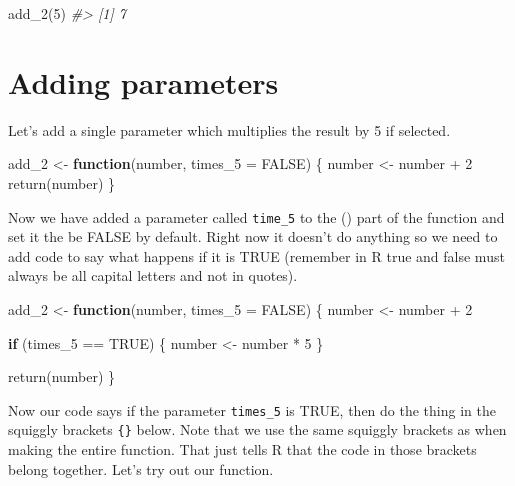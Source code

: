 \documentclass[
]{krantz}
\makeatletter
\newenvironment{Shaded}{\begin{snugshade}}{\end{snugshade}}
\newcommand{\AttributeTok}[1]{\textcolor[rgb]{0.61,0.61,0.61}{#1}}
\newcommand{\CommentTok}[1]{\textcolor[rgb]{0.37,0.37,0.37}{\textit{#1}}}
\newcommand{\ConstantTok}[1]{\textcolor[rgb]{0,0,0}{#1}}
\newcommand{\ControlFlowTok}[1]{\textcolor[rgb]{0.27,0.27,0.27}{\textbf{#1}}}
\newcommand{\DecValTok}[1]{\textcolor[rgb]{0.06,0.06,0.06}{#1}}
\newcommand{\FunctionTok}[1]{\textcolor[rgb]{0,0,0}{#1}}
\newcommand{\NormalTok}[1]{#1}
\newcommand{\OtherTok}[1]{\textcolor[rgb]{0.37,0.37,0.37}{#1}}
\newcommand{\SpecialCharTok}[1]{\textcolor[rgb]{0,0,0}{#1}}
\newenvironment{kframe}{%
\medskip{}
\setlength{\fboxsep}{.8em}
 \def\at@end@of@kframe{}%
 \ifinner\ifhmode%
  \def\at@end@of@kframe{\end{minipage}}%
  \begin{minipage}{\columnwidth}%
 \fi\fi%
 \def\FrameCommand##1{\hskip\@totalleftmargin \hskip-\fboxsep
 \colorbox{shadecolor}{##1}\hskip-\fboxsep
     \hskip-\linewidth \hskip-\@totalleftmargin \hskip\columnwidth}%
 \MakeFramed {\advance\hsize-\width
   \@totalleftmargin\z@ \linewidth\hsize
   \@setminipage}}%
 {\par\unskip\endMakeFramed%
 \at@end@of@kframe}
\renewenvironment{Shaded}{\begin{kframe}}{\end{kframe}}
\makeatother
\begin{document}
\begin{Shaded}
\begin{Highlighting}[]
\FunctionTok{add\_2}\NormalTok{(}\DecValTok{5}\NormalTok{)}
\CommentTok{\#\textgreater{} [1] 7}
\end{Highlighting}
\end{Shaded}

\hypertarget{adding-parameters}{%
\section{Adding parameters}\label{adding-parameters}}

Let's add a single parameter which multiplies the result by
5 if selected.

\begin{Shaded}
\begin{Highlighting}[]
\NormalTok{add\_2 }\OtherTok{\textless{}{-}} \ControlFlowTok{function}\NormalTok{(number, }\AttributeTok{times\_5 =} \ConstantTok{FALSE}\NormalTok{) \{}
\NormalTok{  number }\OtherTok{\textless{}{-}}\NormalTok{ number }\SpecialCharTok{+} \DecValTok{2}
  \FunctionTok{return}\NormalTok{(number)}
\NormalTok{\}}
\end{Highlighting}
\end{Shaded}

Now we have added a parameter called \texttt{time\_5} to the
() part of the function and set it the be FALSE by default.
Right now it doesn't do anything so we need to add code to
say what happens if it is TRUE (remember in R true and false
must always be all capital letters and not in quotes).

\begin{Shaded}
\begin{Highlighting}[]
\NormalTok{add\_2 }\OtherTok{\textless{}{-}} \ControlFlowTok{function}\NormalTok{(number, }\AttributeTok{times\_5 =} \ConstantTok{FALSE}\NormalTok{) \{}
\NormalTok{  number }\OtherTok{\textless{}{-}}\NormalTok{ number }\SpecialCharTok{+} \DecValTok{2}

  \ControlFlowTok{if}\NormalTok{ (times\_5 }\SpecialCharTok{==} \ConstantTok{TRUE}\NormalTok{) \{}
\NormalTok{    number }\OtherTok{\textless{}{-}}\NormalTok{ number }\SpecialCharTok{*} \DecValTok{5}
\NormalTok{  \}}

  \FunctionTok{return}\NormalTok{(number)}
\NormalTok{\}}
\end{Highlighting}
\end{Shaded}

Now our code says if the parameter \texttt{times\_5} is
TRUE, then do the thing in the squiggly brackets
\texttt{\{\}} below. Note that we use the same squiggly
brackets as when making the entire function. That just tells
R that the code in those brackets belong together. Let's try
out our function.
\end{document}
